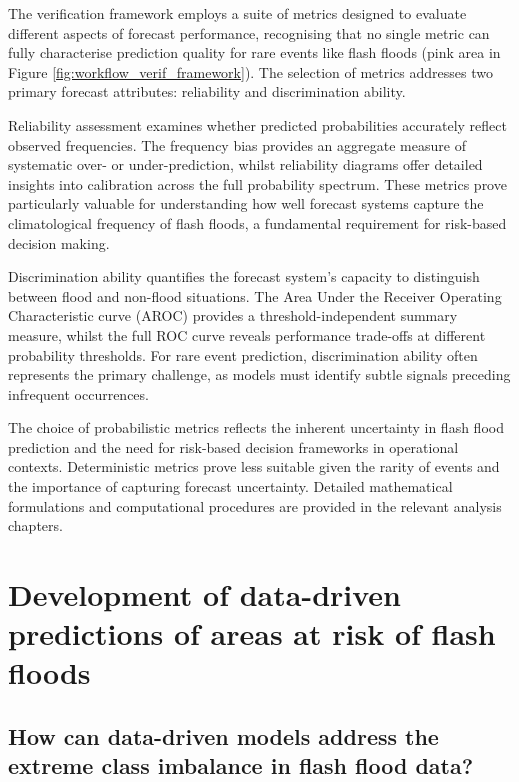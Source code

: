 The verification framework employs a suite of metrics designed to evaluate different aspects of forecast performance, recognising that no single metric can fully characterise prediction quality for rare events like flash floods (pink area in Figure \ref{fig:workflow_verif_framework}). The selection of metrics addresses two primary forecast attributes: reliability and discrimination ability.

Reliability assessment examines whether predicted probabilities accurately reflect observed frequencies. The frequency bias provides an aggregate measure of systematic over- or under-prediction, whilst reliability diagrams offer detailed insights into calibration across the full probability spectrum. These metrics prove particularly valuable for understanding how well forecast systems capture the climatological frequency of flash floods, a fundamental requirement for risk-based decision making.

Discrimination ability quantifies the forecast system's capacity to distinguish between flood and non-flood situations. The Area Under the Receiver Operating Characteristic curve (AROC) provides a threshold-independent summary measure, whilst the full ROC curve reveals performance trade-offs at different probability thresholds. For rare event prediction, discrimination ability often represents the primary challenge, as models must identify subtle signals preceding infrequent occurrences.

The choice of probabilistic metrics reflects the inherent uncertainty in flash flood prediction and the need for risk-based decision frameworks in operational contexts. Deterministic metrics prove less suitable given the rarity of events and the importance of capturing forecast uncertainty. Detailed mathematical formulations and computational procedures are provided in the relevant analysis chapters.

\section{Development of data-driven predictions of areas at risk of flash floods}


\subsection{How can data-driven models address the extreme class imbalance in flash flood data?}

